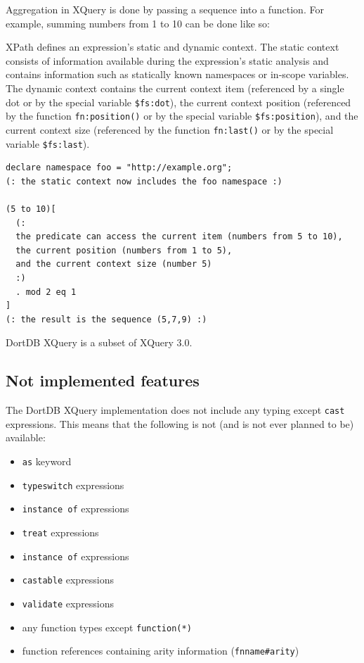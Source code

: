 Aggregation in XQuery is done by passing a sequence into a function. For example, summing numbers from 1 to 10 can be done like so:


XPath defines an expression's static and dynamic context. The static context consists of information available during the expression's static analysis and contains information such as statically known namespaces or in-scope variables. The dynamic context contains the current context item (referenced by a single dot or by the special variable \texttt{\$fs:dot}), the current context position (referenced by the function \texttt{fn:position()} or by the special variable \texttt{\$fs:position}), and the current context size (referenced by the function \texttt{fn:last()} or by the special variable \texttt{\$fs:last}).

\begin{verbatim}
declare namespace foo = "http://example.org";
(: the static context now includes the foo namespace :)

(5 to 10)[
  (:
  the predicate can access the current item (numbers from 5 to 10),
  the current position (numbers from 1 to 5),
  and the current context size (number 5)
  :)
  . mod 2 eq 1
]
(: the result is the sequence (5,7,9) :)
\end{verbatim}

DortDB XQuery is a subset of XQuery 3.0.

\subsection{Not implemented features}

The DortDB XQuery implementation does not include any typing except \texttt{cast} expressions. This means that the following is not (and is not ever planned to be) available:

\begin{itemize}
    \item \texttt{as} keyword
    \item \texttt{typeswitch} expressions
    \item \texttt{instance of} expressions
    \item \texttt{treat} expressions
    \item \texttt{instance of} expressions
    \item \texttt{castable} expressions
    \item \texttt{validate} expressions
    \item any function types except \texttt{function(*)} 
    \item function references containing arity information (\texttt{fnname\#arity})
\end{itemize}

